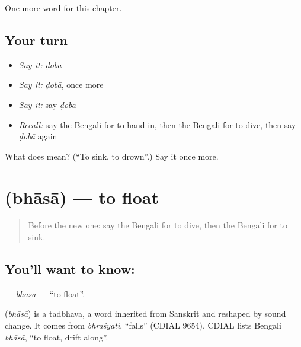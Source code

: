 \begin{grammarlens}[title={What you've built}]
One more word for this chapter.
\end{grammarlens}

\subsection*{Your turn}
\begin{itemize}
\raggedright
  \item \emph{Say it:} \emph{ḍobā}
  \item \emph{Say it:} \emph{ḍobā}, once more
  \item \emph{Say it:} say \emph{ḍobā}
  \item \emph{Recall:} say the Bengali for to hand in, then the Bengali for to dive, then say \emph{ḍobā} again
\end{itemize}

\begin{tcolorbox}[breakable,colback=teal!4,colframe=teal!35!black,title={Before you move on}]
What does  mean? (\textquotedblleft{}To sink, to drown\textquotedblright{}.) Say it once more.
\end{tcolorbox}
\section[\texorpdfstring{\bn{ভাসা} (bhāsā)}{ভাসা (bhāsā)}]{ (bhāsā) — to float}

\label{lesson:BN-C240-bhasa}



\begin{quote}
Before the new one: say the Bengali for to dive, then the Bengali for to sink.
\end{quote}

\subsection*{You'll want to know: }
\textbf{} — \emph{bhāsā} — \textquotedblleft{}to float\textquotedblright{}.

\begin{cousinweb}
\textbf{} (\emph{bhāsā}) is a tadbhava, a word inherited from Sanskrit and reshaped by sound change. It comes from \emph{bhraśyati}, \textquotedblleft{}falls\textquotedblright{} (CDIAL 9654). CDIAL lists Bengali \emph{bhāsā}, \textquotedblleft{}to float, drift along\textquotedblright{}.
\end{cousinweb}

